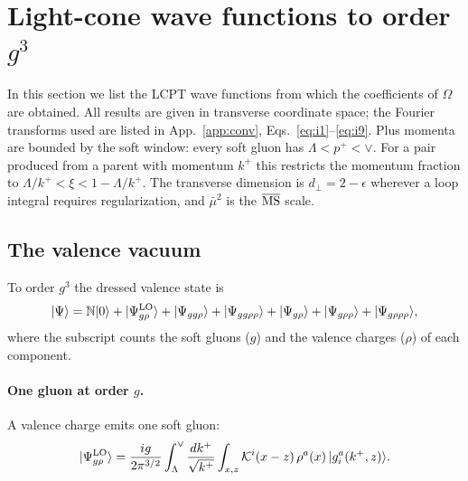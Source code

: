 \section{Light-cone wave functions to order \texorpdfstring{$g^3$}{g3}}\label{sec:lcwf}

In this section we list the LCPT wave functions from which the coefficients of $\Omega$ are obtained. All results are given in transverse coordinate space; the Fourier transforms used are listed in App.~\ref{app:conv}, Eqs.~\eqref{eq:i1}--\eqref{eq:i9}. Plus momenta are bounded by the soft window: every soft gluon has $\Lambda<p^+<\vee$. For a pair produced from a parent with momentum $k^+$ this restricts the momentum fraction to $\Lambda/k^+<\xi<1-\Lambda/k^+$. The transverse dimension is $d_\perp=2-\epsilon$ wherever a loop integral requires regularization, and $\bar\mu^2$ is the $\overline{\rm MS}$ scale.

\subsection{The valence vacuum}\label{sec:vac}

To order $g^3$ the dressed valence state is
\begin{equation}
|\Psi\rangle=\mathbb{N}|0\rangle+|\Psi^{\rm LO}_{g\rho}\rangle+|\Psi_{gg\rho}\rangle+|\Psi_{gg\rho\rho}\rangle+|\Psi_{g\rho}\rangle+|\Psi_{g\rho\rho}\rangle+|\Psi_{g\rho\rho\rho}\rangle,
\label{eq:NLOWF}
\end{equation}
where the subscript counts the soft gluons ($g$) and the valence charges ($\rho$) of each component.

\paragraph*{One gluon at order $g$.} A valence charge emits one soft gluon:
\begin{equation}
|\Psi^{\rm LO}_{g\rho}\rangle=\frac{ig}{2\pi^{3/2}}\int_{\Lambda}^{\vee}\frac{dk^+}{\sqrt{k^+}}\int_{x,z}\mathcal{K}^i(x-z)\,\rho^a(x)\,|g^a_i(k^+,z)\rangle .
\label{eq:LOwf}
\end{equation}

